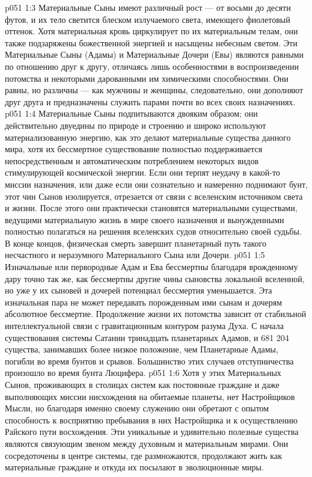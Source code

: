 \vs p051 1:3 \pc Материальные Сыны имеют различный рост --- от восьми до десяти футов, и их тело светится блеском излучаемого света, имеющего фиолетовый оттенок. Хотя материальная кровь циркулирует по их материальным телам, они также подзаряжены божественной энергией и насыщены небесным светом. Эти Материальные Сыны (Адамы) и Материальные Дочери (Евы) являются равными по отношению друг к другу, отличаясь лишь особенностями в воспроизведении потомства и некоторыми дарованными им химическими способностями. Они равны, но различны --- как мужчины и женщины, следовательно, они дополняют друг друга и предназначены служить парами почти во всех своих назначениях.
\vs p051 1:4 Материальные Сыны подпитываются двояким образом; они действительно двуедины по природе и строению и широко используют материализованную энергию, как это делают материальные существа данного мира, хотя их бессмертное существование полностью поддерживается непосредственным и автоматическим потреблением некоторых видов стимулирующей космической энергии. Если они терпят неудачу в какой\hyp{}то миссии назначения, или даже если они сознательно и намеренно поднимают бунт, этот чин Сынов изолируется, отрезается от связи с вселенским источником света и жизни. После этого они практически становятся материальными существами, ведущими материальную жизнь в мире своего назначения и вынужденными полностью полагаться на решения вселенских судов относительно своей судьбы. В конце концов, физическая смерть завершит планетарный путь такого несчастного и неразумного Материального Сына или Дочери.
\vs p051 1:5 Изначальные или первородные Адам и Ева бессмертны благодаря врожденному дару точно так же, как бессмертны другие чины сыновства локальной вселенной, но уже у их сыновей и дочерей потенциал бессмертия уменьшается. Эта изначальная пара не может передавать порожденным ими сынам и дочерям абсолютное бессмертие. Продолжение жизни их потомства зависит от стабильной интеллектуальной связи с гравитационным контуром разума Духа. С начала существования системы Сатании тринадцать планетарных Адамов, и 681 204 существа, занимавших более низкое положение, чем Планетарные Адамы, погибли во время бунтов и срывов. Большинство этих случаев отступничества произошло во время бунта Люцифера.
\vs p051 1:6 \pc Хотя у этих Материальных Сынов, проживающих в столицах систем как постоянные граждане и даже выполняющих миссии нисхождения на обитаемые планеты, нет Настройщиков Мысли, но благодаря именно своему служению они обретают с опытом способность к восприятию пребывания в них Настройщика и к осуществлению Райского пути восхождения. Эти уникальные и удивительно полезные существа являются связующим звеном между духовным и материальным мирами. Они сосредоточены в центре системы, где размножаются, продолжают жить как материальные граждане и откуда их посылают в эволюционные миры.
